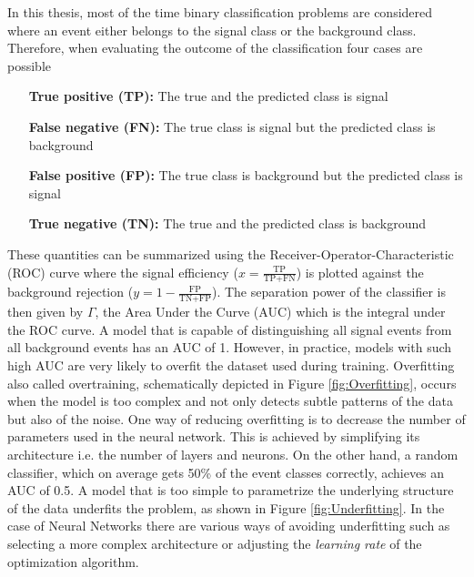 In this thesis, most of the time binary classification problems are considered where an event either belongs to the signal class or the background class. Therefore, when evaluating the outcome of the classification four cases are possible
\begin{enumerate}[leftmargin=3.5cm]
\setlength{\itemsep}{1pt}
\item[\textbf{True positive (TP):}] The true and the predicted class is signal
\item[\textbf{False negative (FN):}] The true class is signal but the predicted class is background
\item[\textbf{False positive (FP):}] The true class is background but the predicted class is signal
\item[\textbf{True negative (TN):}] The true and the predicted class is background
\end{enumerate}
These quantities can be summarized using the Receiver-Operator-Characteristic (ROC) curve where the signal efficiency ($x = \frac{\text{TP}}{\text{TP}+\text{FN}}$) is plotted against the background rejection ($y =1 - \frac{\text{FP}}{\text{TN}+\text{FP}}$). The separation power of the classifier is then given by $\Gamma$, the Area Under the Curve (AUC) which is the integral under the ROC curve. A model that is capable of distinguishing all signal events from all background events has an AUC of 1. However, in practice, models with such high AUC are very likely to overfit the dataset used during training. Overfitting also called overtraining, schematically depicted in Figure \ref{fig:Overfitting}, occurs when the model is too complex and not only detects subtle patterns of the data but also of the noise. One way of reducing overfitting is to decrease the number of parameters used in the neural network. This is achieved by simplifying its architecture i.e. the number of layers and neurons. On the other hand, a random classifier, which on average gets 50\% of the event classes correctly, achieves an AUC of 0.5. A model that is too simple to parametrize the underlying structure of the data underfits the problem, as shown in Figure \ref{fig:Underfitting}. In the case of Neural Networks there are various ways of avoiding underfitting such as selecting a more complex architecture or adjusting the \textit{learning rate} of the optimization algorithm.

\newpage

